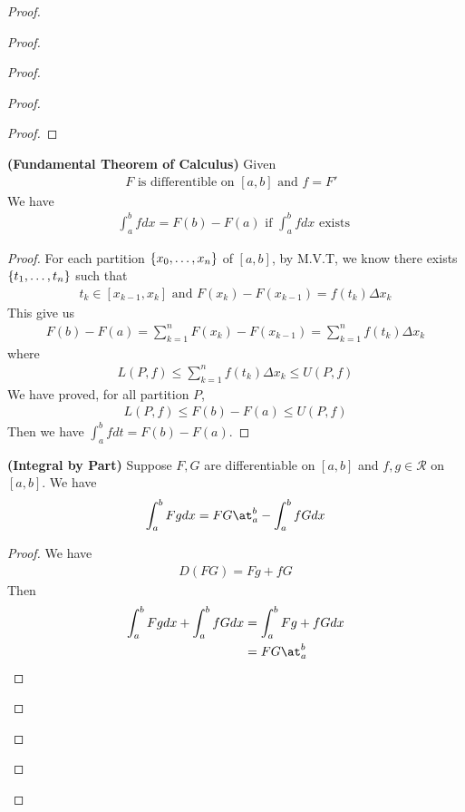 \documentclass{report}
\begin{document}
\begin{proof}
\begin{proof}
\begin{proof}
\begin{proof}
\begin{proof}
\end{proof}
\begin{theorem}
\textbf{(Fundamental Theorem of Calculus)} Given 
\begin{align*}
F\text{ is differentible on $[a,b]$ and $f=F'$ }
\end{align*}
We have 
\begin{align*}
\int_a^b fdx= F(b)-F(a)\text{ if $\int_a^b fdx$ exists }
\end{align*}
\end{theorem}
\begin{proof}
For each partition $\{ x_0,\dots ,x_n \}$ of $[a,b]$, by M.V.T, we know there exists $\{ t_1,\dots, t_n \}$ such that 
\begin{align*}
t_k \in [x_{k-1},x_k]\text{ and } F(x_k)-F(x_{k-1})=f(t_k)\Delta x_k
\end{align*}
This give us 
\begin{align*}
F(b)-F(a)=\sum_{k=1}^n F(x_k)-F(x_{k-1}) =\sum_{k=1}^n f(t_k)\Delta x_k 
\end{align*}
where 
\begin{align*}
L(P,f)\leq \sum_{k=1}^n f(t_k)\Delta x_k \leq U(P,f)
\end{align*}
We have proved, for all partition $P$, 
 \begin{align*}
L(P,f)\leq F(b)-F(a) \leq U(P,f)
\end{align*}
Then we have $\int_a^b fdt =F(b)-F(a)$. 
\end{proof}
\begin{theorem}
\textbf{(Integral by Part)} Suppose $F,G$ are differentiable on $[a,b]$ and  $f,g \in \mathscr{R}$ on $[a,b]$. We have 
\begin{align*}
\int_a^b Fgdx=FG\at_{a}^b-\int_a^b fGdx
\end{align*}
\end{theorem}
\begin{proof}
We have 
\begin{align*}
D(FG)=Fg+fG
\end{align*}
Then 
\begin{align*}
\int_a^b Fgdx+\int_a^b fGdx&= \int_a^b Fg+fG dx\\
&=FG\at_{a}^b
\end{align*}
\end{proof}








\end{proof}
\end{proof}
\end{proof}
\end{proof}
\end{document}
